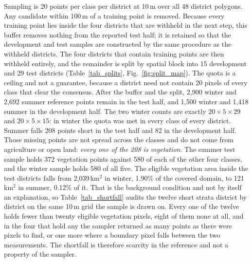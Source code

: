 \documentclass[conference]{IEEEtran}
\begin{document}
Sampling is 20 points per class per district at 10\,m over all 48 district polygons. Any candidate within 100\,m of a training point is removed. Because every training point lies inside the four districts that are withheld in the next step, this buffer removes nothing from the reported test half; it is retained so that the development and test samples are constructed by the same procedure as the withheld districts. The four districts that contain training points are then withheld entirely, and the remainder is split by spatial block into 15 development and 29 test districts (Table~\ref{tab_splits}, Fig.~\ref{fig:split_map}). The quota is a ceiling and not a guarantee, because a district need not contain 20 pixels of every class that clear the consensus. After the buffer and the split, 2,900 winter and 2,692 summer reference points remain in the test half, and 1,500 winter and 1,418 summer in the development half. The two winter counts are exactly $20\times5\times29$ and $20\times5\times15$: in winter the quota was met in every class of every district. Summer falls 208 points short in the test half and 82 in the development half. Those missing points are not spread across the classes and do not come from agriculture or open land: \emph{every one of the 208 is vegetation}. The summer test sample holds 372 vegetation points against 580 of each of the other four classes, and the winter sample holds 580 of all five. The eligible vegetation area inside the test districts falls from 2,039\,km$^2$ in winter, 1.90\% of the covered domain, to 121\,km$^2$ in summer, 0.12\% of it. That is the background condition and not by itself an explanation, so Table~\ref{tab_shortfall} audits the twelve short strata district by district on the same 10\,m grid the sample is drawn on. Every one of the twelve holds fewer than twenty eligible vegetation pixels, eight of them none at all, and in the four that hold any the sampler returned as many points as there were pixels to find, or one more where a boundary pixel falls between the two measurements. The shortfall is therefore scarcity in the reference and not a property of the sampler.
\end{document}
